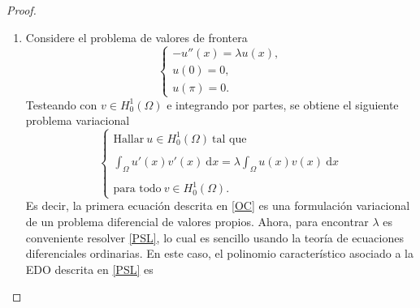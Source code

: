 \documentclass[10pt,a4paper]{report}
\newcommand{\abs}[2][y]{\if#1y\left\fi\lvert#2\if#1y\right\fi\rvert}
\theoremstyle{definition}
\renewcommand{\theproblem}{\Alph{problem}}
\numberwithin{equation}{problem}
\providecommand{\abs}[1]{\left\lvert#1\right\rvert}
\begin{document}
\begin{proof}
\begin{enumerate}[label=\textbf{\theproblem.\Roman{*}.},ref=\theproblem.\Roman{*},parsep=1ex]
            \begin{align*}
            	\int_{\Omega}u'(x)v'(x)\ \text{d}x = \lambda \int_{\Omega}u(x)v(x)\ \text{d}x \quad \text{y} \quad \int_{\Omega}\abs{u(x)}^{2}\ \text{d}x = 1,
            \end{align*}
            para todo $v\in H_{0}^{1}(\Omega)$. En particular, tomando $v=u$, es claro que
            \begin{align*}
            	\int_{\Omega}\abs{u'(x)}^{2}\ \text{d}x = \lambda \int_{\Omega}\abs{u(x)}^{2}\ \text{d}x 
            \end{align*}
            Usando la restricción de $u$, se deduce que 
            \begin{align*}
            	\lambda = \int_{\Omega}\abs{u'(x)}^{2}\ \text{d}x.
            \end{align*}
            Además, $u$ es un minimizador global de \eqref{IDM}, por lo que 
            \begin{align*}
            	C = F(u) = \int_{\Omega}\abs{u'(x)}^{2}\ \text{d}x = \lambda.
            \end{align*}
            \item Considere el problema de valores de frontera 
            \begin{equation}\label{PSL}
            	\left\{
            	\begin{array}{c}
            		-u''(x) = \lambda u(x),\\
            		u(0) = 0, \\
            		u(\pi) = 0.
            	\end{array}
            	\right.
            \end{equation}
           Testeando con $v\in H^{1}_{0}(\Omega)$ e integrando por partes, se obtiene el siguiente problema variacional  
           \begin{equation}\label{WPSL}
           	\left\{
           	\begin{array}{c}
           		\text{Hallar}\ u\in H_{0}^{1}(\Omega)\ \text{tal que} \\~\\
           		 \int_{\Omega} u'(x)v'(x)\ \text{d}x = \lambda \int_{\Omega}u(x)v(x)\ \text{d}x\\~\\
           		\text{para todo}\ v\in H_{0}^{1}(\Omega).
           	\end{array}
           	\right.
           \end{equation}
           Es decir, la primera ecuación descrita en \eqref{OC} es una formulación variacional de un problema diferencial de valores propios. Ahora, para encontrar $\lambda$ es conveniente resolver \eqref{PSL}, lo cual es sencillo usando la teoría de ecuaciones diferenciales ordinarias. En este caso, el polinomio característico asociado a la EDO descrita en \eqref{PSL} es

\end{enumerate}
\end{proof}
\end{document}
